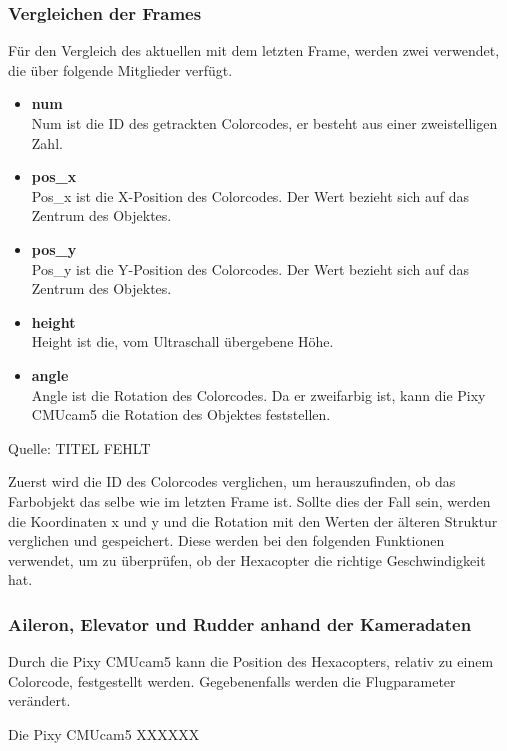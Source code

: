     \subsubsection{Vergleichen der Frames}
    Für den Vergleich des aktuellen mit dem letzten Frame, werden zwei  verwendet, die über folgende Mitglieder verfügt.
    \begin{itemize}
      \item \textbf{num}\\
      Num ist die ID des getrackten Colorcodes, er besteht aus einer zweistelligen Zahl.
      \item \textbf{pos\_x}\\
      Pos\_x ist die X-Position des Colorcodes. Der Wert bezieht sich auf das Zentrum des Objektes.
      \item \textbf{pos\_y}\\
      Pos\_y ist die Y-Position des Colorcodes. Der Wert bezieht sich auf das Zentrum des Objektes.
      \item \textbf{height}\\
      Height ist die, vom Ultraschall übergebene Höhe.
      \item \textbf{angle}\\
      Angle ist die Rotation des Colorcodes. Da er zweifarbig ist, kann die Pixy CMUcam5 die Rotation des Objektes feststellen.
    \end{itemize}

    Quelle: TITEL FEHLT \cite{Structs}

    Zuerst wird die ID des Colorcodes verglichen, um herauszufinden, ob das Farbobjekt das selbe wie im letzten Frame ist.
    Sollte dies der Fall sein, werden die Koordinaten x und y und die Rotation mit den Werten der älteren Struktur verglichen und gespeichert.
    Diese werden bei den folgenden Funktionen verwendet, um zu überprüfen, ob der Hexacopter die richtige Geschwindigkeit hat.

    \subsubsection{Aileron, Elevator und Rudder anhand der Kameradaten}
    Durch die Pixy CMUcam5 kann die Position des Hexacopters, relativ zu einem Colorcode, festgestellt werden. Gegebenenfalls werden die Flugparameter verändert.

    Die Pixy CMUcam5 XXXXXX %



